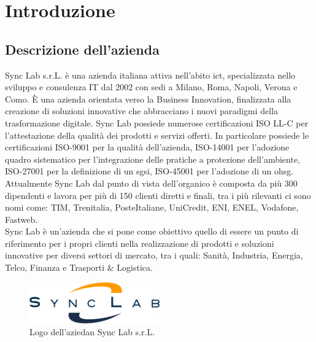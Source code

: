 \chapter{Introduzione}
\label{cap:introduzione}
\section{Descrizione dell'azienda}
Sync Lab s.r.L. è una azienda italiana attiva nell'abito \gls{ict}{}, specializzata nello sviluppo e consulenza IT dal 2002 con sedi a 
Milano, Roma, Napoli, Verona e Como. È una azienda orientata verso la Business Innovation, finalizzata alla 
creazione di soluzioni innovative che abbracciano i nuovi paradigmi della trasformazione digitale.
Sync Lab possiede numerose certificazioni ISO LL-C per l'attestazione della 
qualità dei prodotti e servizi offerti. In particolare possiede le certificazioni 
ISO-9001 per la qualità dell'azienda, ISO-14001 per l'adozione quadro sistematico per l'integrazione delle pratiche a protezione dell'ambiente, ISO-27001 per la definizione di un \gls{sgsi}{}, ISO-45001 per l'adozione di un \gls{ohsg}{}.
\\
Attualmente Sync Lab dal punto di vista dell'organico è composta da più 300 dipendenti e lavora per più di 150 clienti diretti e finali, tra i più rilevanti ci sono nomi come: TIM, Trenitalia, PosteItaliane, UniCredit, ENI, ENEL, Vodafone, Fastweb.
\\
Sync Lab è un'azienda che si pone come obiettivo quello di essere un punto di riferimento per i propri clienti nella realizzazione di prodotti e soluzioni innovative per diversi settori di mercato, tra i quali: Sanità, Industria, Energia, Telco, Finanza e Trasporti \& Logistica.
\begin{figure}[htbp]  
\centering
    \includegraphics[width=0.5\textwidth]{images/introduzione/logo_azienda.png}
    \caption{Logo dell'aziedan Sync Lab s.r.L.}
\end{figure}
\pagebreak
